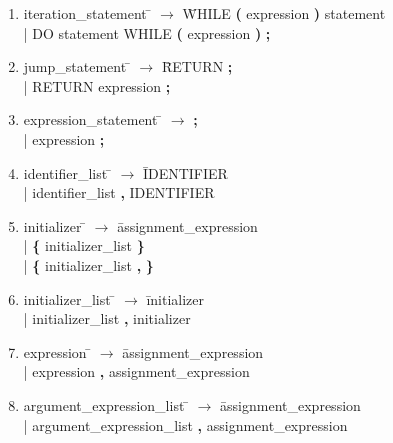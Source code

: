 \documentclass[11pt]{article}
\begin{document}
\begin{enumerate}
\item \begin{tabbing} iteration{\_}statement \= $\to$ \= WHILE \textbf{(} expression \textbf{)} statement \\
	\> | \> DO statement WHILE \textbf{(} expression \textbf{)} \textbf{;}
\end{tabbing}

\item \begin{tabbing} jump{\_}statement \= $\to$ \= RETURN \textbf{;} \\
	\> | \> RETURN expression \textbf{;}
\end{tabbing}

\item \begin{tabbing} expression{\_}statement \= $\to$ \= \textbf{;} \\
	\> | \> expression \textbf{;}
\end{tabbing}

\item \begin{tabbing} identifier{\_}list \= $\to$ \= IDENTIFIER \\
	\> | \> identifier{\_}list \textbf{,} IDENTIFIER
\end{tabbing}

\item \begin{tabbing} initializer \= $\to$ \= assignment{\_}expression \\
	\> | \> \textbf{\{} initializer{\_}list \textbf{\}} \\
	\> | \> \textbf{\{} initializer{\_}list \textbf{,} \textbf{\}}
\end{tabbing}

\item \begin{tabbing} initializer{\_}list \= $\to$ \= initializer \\
	\> | \> initializer{\_}list \textbf{,} initializer
\end{tabbing}

\item \begin{tabbing} expression \= $\to$ \= assignment{\_}expression \\
	\> | \> expression \textbf{,} assignment{\_}expression
\end{tabbing}

\item \begin{tabbing} argument{\_}expression{\_}list \= $\to$ \= assignment{\_}expression \\
	\> | \> argument{\_}expression{\_}list \textbf{,} assignment{\_}expression
\end{tabbing}


\end{enumerate}
\end{document}

